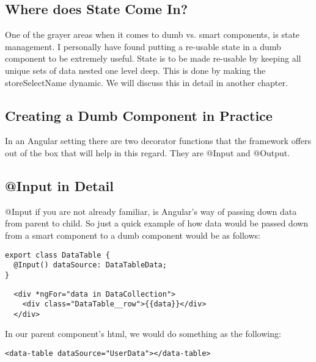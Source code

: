 \subsection{ Where does State Come In? }
One of the grayer areas when it comes to dumb vs. smart components, is state
management. I personally have found putting a re-usable state in a dumb
component to be extremely useful. State is to be made re-usable by keeping all
unique sets of data nested one level deep. This is done by making the
storeSelectName dynamic. We will discuss this in detail in another chapter.

\subsection{Creating a Dumb Component in Practice}
In an Angular setting there are two decorator functions that the framework
offers out of the box that will help in this regard. They are @Input and
@Output.

\subsection{@Input in Detail}
@Input if you are not already familiar, is Angular's way of passing down data
from parent to child. So just a quick example of how data would be passed down
from a smart component to a dumb component would be as follows:
\begin{lstlisting}
export class DataTable {
  @Input() dataSource: DataTableData;
}
\end{lstlisting}
\begin{verbatim}
  <div *ngFor="data in DataCollection">
    <div class="DataTable__row">{{data}}</div>
  </div>
\end{verbatim}

In our parent component's html, we would do something as the following:
\begin{lstlisting}
<data-table dataSource="UserData"></data-table>
\end{lstlisting}

